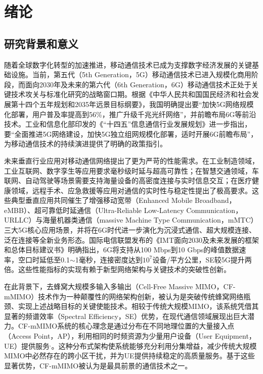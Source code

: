 \chapter{绪论}\label{chap:intro}
\section{研究背景和意义}

随着全球数字化转型的加速推进，移动通信技术已成为支撑数字经济发展的关键基础设施。当前，第五代（5th Generation，5G）移动通信技术已进入规模化商用阶段，而面向2030年及未来的第六代（6th Generation，6G）移动通信技术正处于关键技术攻关与标准化研究的战略窗口期\cite{chapterone1}。根据《中华人民共和国国民经济和社会发展第十四个五年规划和2035年远景目标纲要》\cite{chapterone2}，我国明确提出要“加快5G网络规模化部署，用户普及率提高到56\%，推广升级千兆光纤网络”，并前瞻布局6G等前沿技术。工业和信息化部印发的《“十四五”信息通信行业发展规划》\cite{chapterone3}进一步指出，要“全面推进5G网络建设，加快5G独立组网规模化部署，适时开展6G前瞻布局”，为移动通信技术的持续演进提供了明确的政策指引。

未来垂直行业应用对移动通信网络提出了更为严苛的性能需求。在工业制造领域，工业互联网、数字孪生等应用要求毫秒级时延与超高可靠性；在智慧交通领域，车联网、自动驾驶等场景需要支持海量设备的高密度连接与实时信息交互；在医疗健康领域，远程手术、应急救援等应用对通信的实时性与稳定性提出了极高要求。这些典型垂直应用共同催生了增强移动宽带（Enhanced Mobile Broadband，eMBB）、超可靠低时延通信（Ultra-Reliable Low-Latency Communication，URLLC）与海量机器类通信（massive Machine Type Communication，mMTC）三大5G核心应用场景，并将在6G时代进一步演化为沉浸式通信、超大规模连接、泛在连接等全新业务形态\cite{chapterone4}。国际电信联盟发布的《IMT面向2030及未来发展的框架和总体目标建议书》明确指出，6G将支持从100 Mbps到10 Gbps的峰值数据速率，空口时延低至0.1$\sim $1毫秒，连接密度达到$10^7$设备/平方公里，SE较5G提升两倍。这些性能指标的实现有赖于新型网络架构与关键技术的突破性创新。

在此背景下，去蜂窝大规模多输入多输出（Cell-Free Massive MIMO，CF-mMIMO）技术作为一种颠覆性的网络架构创新，被认为是突破传统蜂窝网络瓶颈、实现上述战略目标的关键使能技术\cite{chapterone5}。相较于传统大规模MIMO，该系统凭借其显著的频谱效率（Spectral Efficiency，SE）优势，在现代通信领域展现出巨大潜力\cite{chapterone6}。CF-mMIMO系统的核心理念是通过分布在不同地理位置的大量接入点（Access Point，AP），利用相同的时频资源为少量用户设备（User Equipment，UE）提供服务\cite{chapterone7}$^,$\cite{chapterone8}。这种分布式架构使系统能够充分利用分集增益，减少传统大规模MIMO中必然存在的跨小区干扰\cite{chapterone9}，并为UE提供持续稳定的高质量服务。基于这些显著优势，CF-mMIMO被认为是最具前景的通信技术之一\cite{chapterone10}。

